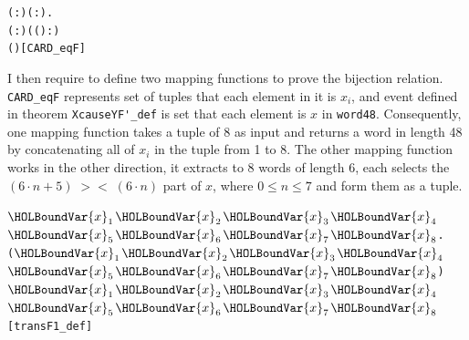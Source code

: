 \documentclass{article}
\begin{document}
\begin{alltt}
\HOLTokenTurnstile{} \HOLSymConst{\HOLTokenForall{}}( :) ( :).
      \HOLTokenLeftbrace{} \HOLTokenBar{} (  :) \HOLSymConst{\HOLTokenEor{}} ( ( \HOLSymConst{\HOLTokenEor{}}  ) :) \HOLSymConst{=} \HOLTokenRightbrace{} \HOLSymConst{=}
      (  )\hfill{[CARD_eqF]}
\end{alltt}

I then require to define two mapping functions to prove the bijection relation. \verb|CARD_eqF| represents set of
tuples that each element in it is $x_i$, and event defined in theorem \verb|XcauseYF'_def| is set that each element is $x$
in \verb|word48|. Consequently, one mapping function takes a tuple of 8 as input and returns a word in length 48 by concatenating
all of $x_i$ in the tuple from 1 to 8. The other mapping function works in the other direction, it extracts to 8 words of length
6, each selects the $(6 \cdot n + 5) \;><\; (6 \cdot n)$ part of $x$, where $0 \leq n \leq 7$ and form them as a tuple.

\begin{alltt}
\HOLTokenTurnstile{} \HOLSymConst{\HOLTokenForall{}}\ensuremath{\HOLBoundVar{x}\sb{\mathrm{1}}} \ensuremath{\HOLBoundVar{x}\sb{\mathrm{2}}} \ensuremath{\HOLBoundVar{x}\sb{\mathrm{3}}} \ensuremath{\HOLBoundVar{x}\sb{\mathrm{4}}} \ensuremath{\HOLBoundVar{x}\sb{\mathrm{5}}} \ensuremath{\HOLBoundVar{x}\sb{\mathrm{6}}} \ensuremath{\HOLBoundVar{x}\sb{\mathrm{7}}} \ensuremath{\HOLBoundVar{x}\sb{\mathrm{8}}}.
      (\ensuremath{\HOLBoundVar{x}\sb{\mathrm{1}}}\HOLSymConst{,}\ensuremath{\HOLBoundVar{x}\sb{\mathrm{2}}}\HOLSymConst{,}\ensuremath{\HOLBoundVar{x}\sb{\mathrm{3}}}\HOLSymConst{,}\ensuremath{\HOLBoundVar{x}\sb{\mathrm{4}}}\HOLSymConst{,}\ensuremath{\HOLBoundVar{x}\sb{\mathrm{5}}}\HOLSymConst{,}\ensuremath{\HOLBoundVar{x}\sb{\mathrm{6}}}\HOLSymConst{,}\ensuremath{\HOLBoundVar{x}\sb{\mathrm{7}}}\HOLSymConst{,}\ensuremath{\HOLBoundVar{x}\sb{\mathrm{8}}}) \HOLSymConst{=}
     \ensuremath{\HOLBoundVar{x}\sb{\mathrm{1}}}  \ensuremath{\HOLBoundVar{x}\sb{\mathrm{2}}}  \ensuremath{\HOLBoundVar{x}\sb{\mathrm{3}}}  \ensuremath{\HOLBoundVar{x}\sb{\mathrm{4}}}  \ensuremath{\HOLBoundVar{x}\sb{\mathrm{5}}}  \ensuremath{\HOLBoundVar{x}\sb{\mathrm{6}}}  \ensuremath{\HOLBoundVar{x}\sb{\mathrm{7}}}  \ensuremath{\HOLBoundVar{x}\sb{\mathrm{8}}}\hfill{[transF1_def]}
\end{alltt}
\end{document}

